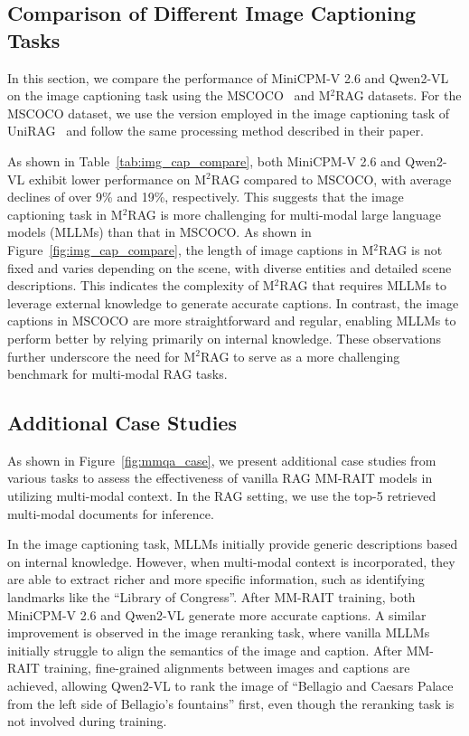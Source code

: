 



\subsection{Comparison of Different Image Captioning Tasks}\label{app:image_cap}
In this section, we compare the performance of MiniCPM-V 2.6 and Qwen2-VL on the image captioning task using the MSCOCO~\cite{lin2014microsoft} and M$^2$RAG datasets. For the MSCOCO dataset, we use the version employed in the image captioning task of UniRAG~\cite{sharifymoghaddam2024unirag} and follow the same processing method described in their paper.

As shown in Table~\ref{tab:img_cap_compare}, both MiniCPM-V 2.6 and Qwen2-VL exhibit lower performance on M$^2$RAG compared to MSCOCO, with average declines of over 9\% and 19\%, respectively. This suggests that the image captioning task in M$^2$RAG is more challenging for multi-modal large language models (MLLMs) than that in MSCOCO. As shown in Figure~\ref{fig:img_cap_compare}, the length of image captions in M$^2$RAG is not fixed and varies depending on the scene, with diverse entities and detailed scene descriptions. This indicates the complexity of M$^2$RAG that requires MLLMs to leverage external knowledge to generate accurate captions. In contrast, the image captions in MSCOCO are more straightforward and regular, enabling MLLMs to perform better by relying primarily on internal knowledge. These observations further underscore the need for M$^2$RAG to serve as a more challenging benchmark for multi-modal RAG tasks.



\subsection{Additional Case Studies}\label{app:case}
As shown in Figure~\ref{fig:mmqa_case}, we present additional case studies from various tasks to assess the effectiveness of vanilla RAG MM-RAIT models in utilizing multi-modal context. In the RAG setting, we use the top-5 retrieved multi-modal documents for inference.

In the image captioning task, MLLMs initially provide generic descriptions based on internal knowledge. However, when multi-modal context is incorporated, they are able to extract richer and more specific information, such as identifying landmarks like the ``Library of Congress''. After MM-RAIT training, both MiniCPM-V 2.6 and Qwen2-VL generate more accurate captions. A similar improvement is observed in the image reranking task, where vanilla MLLMs initially struggle to align the semantics of the image and caption. After MM-RAIT training, fine-grained alignments between images and captions are achieved, allowing Qwen2-VL to rank the image of ``Bellagio and Caesars Palace from the left side of Bellagio's fountains'' first, even though the reranking task is not involved during training.

